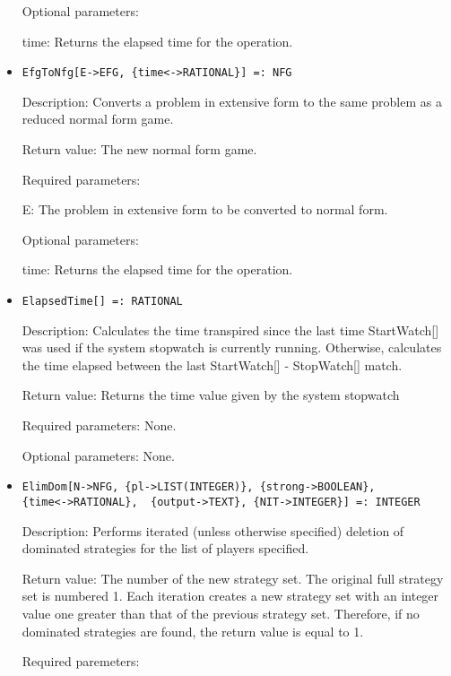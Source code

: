 \begin{itemize}
\item
[Optional parameters:]\hfil\null
	
\bd
\item
[time:] Returns the elapsed time for the operation.
\ed
\ed

\item
\protect \large \begin{verbatim}
EfgToNfg[E->EFG, {time<->RATIONAL}] =: NFG
\end{verbatim}\normalsize

\bd
\item
[Description:] Converts a problem in extensive form to the same
problem as a reduced normal form game.
\item
[Return value:] The new normal form game.
\item
[Required parameters:]\hfil\null
	
\bd
\item
[E:] The problem in extensive form to be converted to normal form.
\ed

\item
[Optional parameters:]\hfil\null
	
\bd
\item
[time:] Returns the elapsed time for the operation.
\ed
\ed

\item

\protect \large \begin{verbatim}
ElapsedTime[] =: RATIONAL
\end{verbatim}\normalsize

\bd
\item
[Description:] Calculates the time transpired since the last time
StartWatch[] was used if the system stopwatch is currently running.
Otherwise, calculates the time elapsed between the last StartWatch[] -
StopWatch[] match.
\item
[Return value:] Returns the time value given by the system stopwatch
\item
[Required parameters:] None.
\item   
[Optional parameters:] None.
\ed

\item
\protect \large \begin{verbatim}
ElimDom[N->NFG, {pl->LIST(INTEGER)}, {strong->BOOLEAN},
{time<->RATIONAL}, 	{output->TEXT}, {NIT->INTEGER}] =: INTEGER
\end{verbatim} \normalsize

\bd
\item
[Description:] Performs iterated (unless otherwise specified) deletion
of dominated strategies for the list of players specified.
\item  
[Return value:] The number of the new strategy set.  The original full
strategy set is numbered 1.  Each iteration creates a new strategy set
with an integer value one greater than that of the previous strategy
set.  Therefore, if no dominated strategies are found, the return
value is equal to 1.
\item
[Required paremeters:]\hfil\null
	

\end{itemize}
